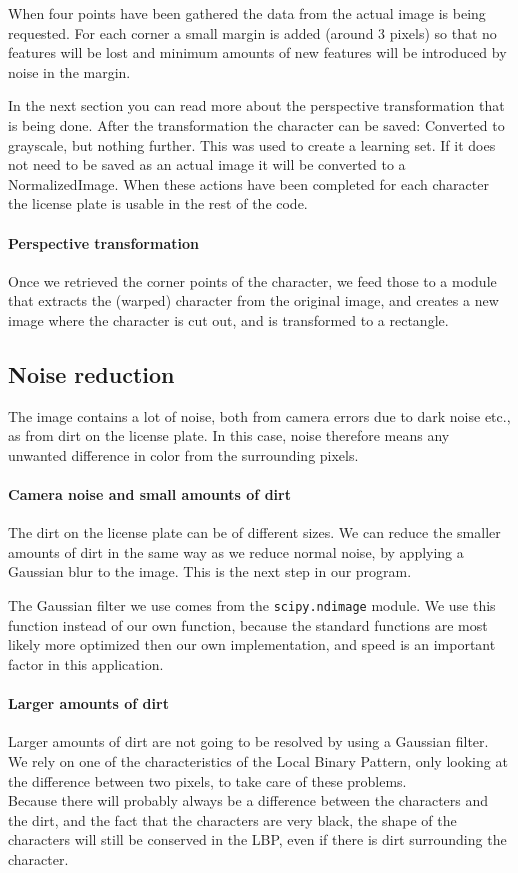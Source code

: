 \documentclass[a4paper]{article}
\begin{document}
When four points have been gathered the data from the actual image is being
requested. For each corner a small margin is added (around 3 pixels) so that no
features will be lost and minimum amounts of new features will be introduced by
noise in the margin.

In the next section you can read more about the perspective transformation that
is being done. After the transformation the character can be saved: Converted
to grayscale, but nothing further. This was used to create a learning set. If
it does not need to be saved as an actual image it will be converted to a
NormalizedImage. When these actions have been completed for each character the
license plate is usable in the rest of the code.

\paragraph*{Perspective transformation}
Once we retrieved the corner points of the character, we feed those to a
module that extracts the (warped) character from the original image, and
creates a new image where the character is cut out, and is transformed to a
rectangle.

\subsection{Noise reduction}

The image contains a lot of noise, both from camera errors due to dark noise
etc., as from dirt on the license plate. In this case, noise therefore means
any unwanted difference in color from the surrounding pixels.

\paragraph*{Camera noise and small amounts of dirt}
The dirt on the license plate can be of different sizes. We can reduce the
smaller amounts of dirt in the same way as we reduce normal noise, by applying
a Gaussian blur to the image. This is the next step in our program.

The Gaussian filter we use comes from the \texttt{scipy.ndimage} module. We use
this function instead of our own function, because the standard functions are
most likely more optimized then our own implementation, and speed is an
important factor in this application.

\paragraph*{Larger amounts of dirt}
Larger amounts of dirt are not going to be resolved by using a Gaussian filter.
We rely on one of the characteristics of the Local Binary Pattern, only looking
at the difference between two pixels, to take care of these problems. \\
Because there will probably always be a difference between the characters and
the dirt, and the fact that the characters are very black, the shape of the
characters will still be conserved in the LBP, even if there is dirt
surrounding the character.
\end{document}

